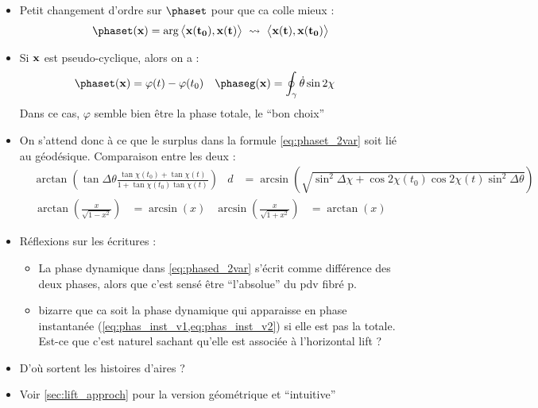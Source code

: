 \begin{itemize}
	
	\item Petit changement d'ordre sur $\phaset$ pour que ca colle mieux :
	\[\phaset(\bf{x}) = \arg\big\langle \bf{x}(t_0), \bf{x}(t)\big\rangle\ \leadsto\  \big\langle \bf{x}(t), \bf{x}(t_0)\big\rangle\]
	
	\item Si $\bf{x}$ est pseudo-cyclique, alors on a :
	\begin{align*}
		\phaset(\bf{x}) &= \varphi(t)-\varphi(t_0)  &  \phaseg(\bf{x}) &= \oint_\gamma \dot{\theta} \sin2\chi
	\end{align*}
	Dans ce cas, $\varphi$ semble bien être la phase totale, le ``bon choix''
	
	\item On s'attend donc à ce que le surplus dans la formule \eqref{eq:phaset_2var} soit lié au géodésique. Comparaison entre les deux :
	\begin{align*}
		&\arctan\left(\tan\Delta\theta \frac{ \tan\chi(t_0)+\tan\chi(t)}{1 + \tan\chi(t_0)\tan\chi(t)}\right)  &
		d &= \arcsin\left(\sqrt{\sin^2\Delta\chi + \cos2\chi(t_0) \cos2\chi(t) \sin^2\Delta\theta}\right)
	\end{align*}
	\begin{align*}
		\arctan\left( \frac{x}{\sqrt{1-x^2}}\right) &= \arcsin(x) & \arcsin\left( \frac{x}{\sqrt{1+x^2}}\right) &= \arctan(x)
	\end{align*}
	
	\item Réflexions sur les écritures :
	\begin{itemize}
		\item La phase dynamique dans \eqref{eq:phased_2var} s'écrit comme différence des deux phases, alors que c'est sensé être ``l'absolue'' du pdv fibré p.
		
		\item bizarre que ca soit la phase dynamique qui apparaisse en phase instantanée (\cref{eq:phas_inst_v1,eq:phas_inst_v2}) si elle est pas la totale. Est-ce que c'est naturel sachant qu'elle est associée à l'horizontal lift ?
	\end{itemize}
	
	\item D'où sortent les histoires d'aires ?
	
	\item Voir \cref{sec:lift_approch} pour la version géométrique et ``intuitive''
\end{itemize}


